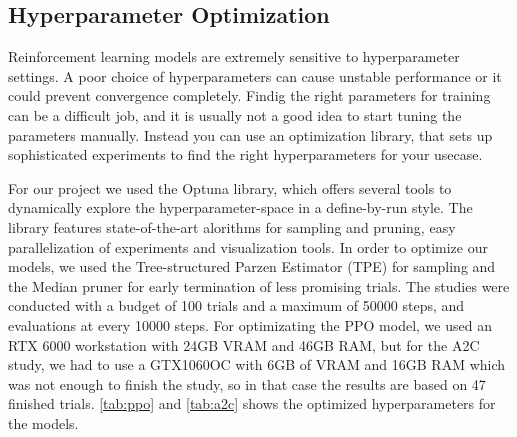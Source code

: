 \documentclass{article}
\begin{document}
\subsection{\normalsize{Hyperparameter Optimization}}
Reinforcement learning models are extremely sensitive to hyperparameter settings. A poor choice of hyperparameters can cause unstable performance or it could prevent convergence completely. Findig the right parameters for training can be a difficult job, and it is usually not a good idea to start tuning the parameters manually. Instead you can use an optimization library, that sets up sophisticated experiments to find the right hyperparameters for your usecase.

For our project we used the Optuna library, which offers several tools to dynamically explore the hyperparameter-space in a define-by-run style. The library features state-of-the-art alorithms for sampling and pruning, easy parallelization of experiments and visualization tools. In order to optimize our models, we used the Tree-structured Parzen Estimator (TPE) for sampling and the Median pruner for early termination of less promising trials. The studies were conducted with a budget of 100 trials and a maximum of 50000 steps, and evaluations at every 10000 steps. For optimizating the PPO model, we used an RTX 6000 workstation with 24GB VRAM and 46GB RAM, but for the A2C study, we had to use a GTX1060OC with 6GB of VRAM and 16GB RAM which was not enough to finish the study, so in that case the results are based on 47 finished trials. \ref{tab:ppo} and \ref{tab:a2c} shows the optimized hyperparameters for the models.
\end{document}
